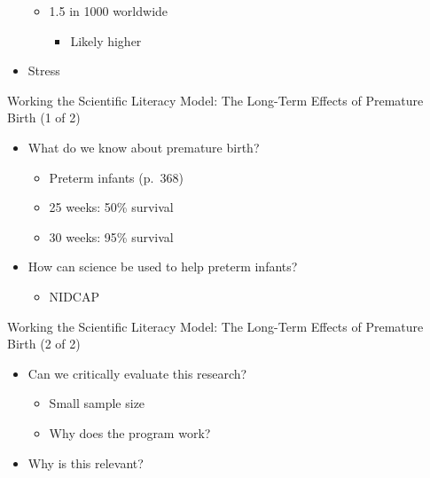 \documentclass[
]{book}
\providecommand{\tightlist}{%
  \setlength{\itemsep}{0pt}\setlength{\parskip}{0pt}}
\begin{document}
\begin{reflect}
\begin{itemize}
  \begin{itemize}
  \tightlist
  \item
    1.5 in 1000 worldwide

    \begin{itemize}
    \tightlist
    \item
      Likely higher\\
    \end{itemize}
  \end{itemize}
\item
  Stress
\end{itemize}

Working the Scientific Literacy Model: The Long-Term Effects of Premature Birth (1 of 2)

\begin{itemize}
\tightlist
\item
  What do we know about premature birth?

  \begin{itemize}
  \tightlist
  \item
    Preterm infants (p.~368)\\
  \item
    25 weeks: 50\% survival\\
  \item
    30 weeks: 95\% survival\\
  \end{itemize}
\item
  How can science be used to help preterm infants?

  \begin{itemize}
  \tightlist
  \item
    NIDCAP
  \end{itemize}
\end{itemize}

Working the Scientific Literacy Model: The Long-Term Effects of Premature Birth (2 of 2)

\begin{itemize}
\tightlist
\item
  Can we critically evaluate this research?

  \begin{itemize}
  \tightlist
  \item
    Small sample size\\
  \item
    Why does the program work?\\
  \end{itemize}
\item
  Why is this relevant?


\end{itemize}
\end{reflect}
\end{document}
